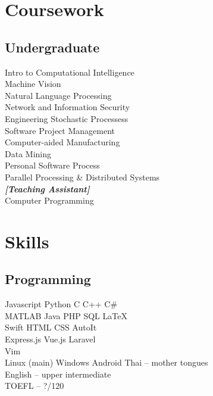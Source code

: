 \documentclass[]{deedy-resume-openfont}
\begin{document}
\begin{minipage}[t]{0.33\textwidth}

\section{Coursework}
\subsection{Undergraduate}
Intro to Computational Intelligence \\
Machine Vision \\
Natural Language Processing \\
Network and Information Security \\
Engineering Stochastic Processess \\
Software Project Management \\
Computer-aided Manufacturing \\
Data Mining \\
Personal Software Process \\
Parallel Processing \& Distributed Systems \\
{\footnotesize \textit{\textbf{[Teaching Assistant]}}} \\
Computer Programming \\


\section{Skills}
\subsection{Programming}
Javascript \textbullet{} Python \textbullet{} C \textbullet{} C++ \textbullet{} C\# \\
MATLAB \textbullet{} Java \textbullet{} PHP \textbullet{} SQL \textbullet{} \LaTeX\ \\
Swift \textbullet{} HTML \textbullet{} CSS \textbullet{} AutoIt \\ 
Express.js \textbullet{} Vue.js \textbullet{} Laravel \\
Vim \\
Linux (main) \textbullet{} Windows \textbullet{} Android
Thai – mother tongues \\
English – upper intermediate \\
TOEFL – ?/120
\sectionsep

%
%

\end{minipage} 
\end{document}
